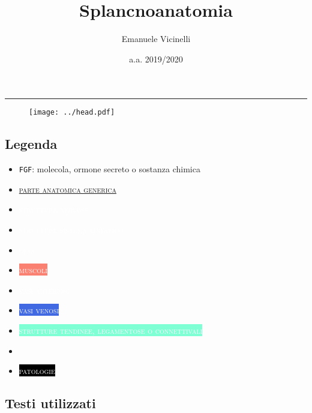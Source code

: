 \documentclass[italian,]{article}
\date{}
\newcommand{\mus}[1]{\colorbox{Salmon}{\textcolor{white}{\textsc{#1}}}}
\newcommand{\oss}[1]{\colorbox{ossa}{\textcolor{white}{\textsc{#1}}}}
\newcommand{\ven}[1]{\colorbox{RoyalBlue}{\textcolor{white}{\textsc{#1}}}}
\newcommand{\art}[1]{\colorbox{RedOrange}{\textcolor{white}{\textsc{#1}}}}
\newcommand{\tol}[1]{\colorbox{Aquamarine}{\textcolor{white}{\textsc{#1}}}}
\newcommand{\ner}[1]{\colorbox{Dandelion}{\textcolor{white}{\textsc{#1}}}}
\newcommand{\lin}[1]{\colorbox{PineGreen}{\textcolor{white}{\textsc{#1}}}}
\newcommand{\far}[1]{ \fbox{\textsc{#1}} } %
\newcommand{\pat}[1]{\colorbox{black}{\textcolor{white}{\textsc{#1}}}}
\renewcommand{\a}[1]{\underline{\textsc{#1}}}
\begin{document}

\title{Splancnoanatomia}
\author{Emanuele Vicinelli}
\date{a.a. 2019/2020}

\maketitle

\begin{center}\rule{0.5\linewidth}{0.5pt}\end{center}

\begin{figure}[H]
\vspace{2cm}
\centering
\texttt{[image: ../head.pdf]}
\end{figure}

\thispagestyle{fancy}
\fancyhead{}
\fancyfoot{}
\renewcommand{\headrulewidth}{0pt}
\rfoot{\today}

\newpage

\hypertarget{legenda}{%
\subsection*{Legenda}\label{legenda}}

\begin{itemize}
\item
  \texttt{FGF}: molecola, ormone secreto o sostanza chimica
\item
  \a{parte anatomica generica}
\item
  \ner{strutture nervose}
\item
  \lin{strutture sistema linfatico}
\item
  \oss{ossa}
\item
  \mus{muscoli}
\item
  \art{vasi arteriosi}
\item
  \ven{vasi venosi}
\item
  \tol{strutture tendinee, legamentose o connettivali}
\item
  \far{farmaci}
\item
  \pat{patologie}
\end{itemize}

\hypertarget{testi-utilizzati}{%
\subsection*{Testi utilizzati}\label{testi-utilizzati}}
\end{document}
